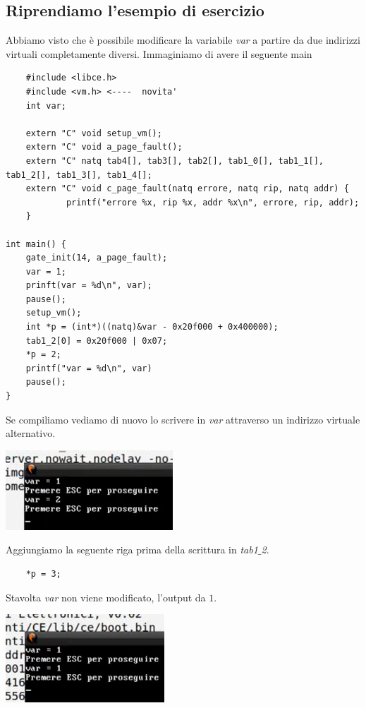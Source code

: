 \documentclass[11pt]{report}
\theoremstyle{definition}
\begin{document}
\subsection{Riprendiamo l'esempio di esercizio} Abbiamo visto che è possibile modificare la variabile \emph{var} a partire da due indirizzi virtuali completamente diversi. Immaginiamo di avere il seguente main
\begin{verbatim}
	#include <libce.h>
	#include <vm.h> <----  novita'
	int var;
	
	extern "C" void setup_vm();
	extern "C" void a_page_fault();
	extern "C" natq tab4[], tab3[], tab2[], tab1_0[], tab1_1[], tab1_2[], tab1_3[], tab1_4[];
	extern "C" void c_page_fault(natq errore, natq rip, natq addr) {
		    printf("errore %x, rip %x, addr %x\n", errore, rip, addr);
	}

int main() {
    gate_init(14, a_page_fault);
    var = 1;
    prinft(var = %d\n", var);
    pause();
    setup_vm();
    int *p = (int*)((natq)&var - 0x20f000 + 0x400000);
    tab1_2[0] = 0x20f000 | 0x07;
    *p = 2;
    printf("var = %d\n", var)
    pause();
}
\end{verbatim}
Se compiliamo vediamo di nuovo lo scrivere in \emph{var} attraverso un indirizzo virtuale alternativo. 
\begin{center}
	\includegraphics{img/233.PNG}
\end{center}
Aggiungiamo la seguente riga prima della scrittura in \emph{tab1$\_$2}.
\begin{verbatim}
	*p = 3;
\end{verbatim}
 Stavolta \emph{var} non viene modificato, l'output da $1$.
\begin{center}
	\includegraphics{img/234.PNG}
\end{center}
\end{document}
